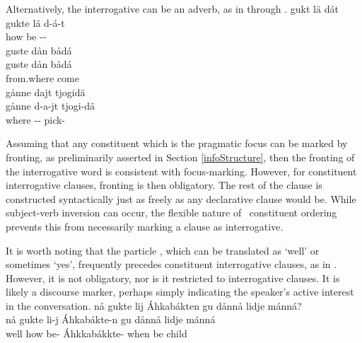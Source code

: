 Alternatively, the interrogative can be an adverb, as in  through . %
\ea\label{questionWordQ6}%
\glll	gukt lä dát\\
	gukte lä d-á-t\\
	how be\BS{} --\\\nopagebreak
{} 
\z
\ea\label{questionWordQ7}%
\glll	guste dån bådá\\
	guste dån bådá\\
	from.where  come\BS{}\\\nopagebreak
{} 
\z
\ea\label{questionWordQ8}%
\glll	gånne dajt tjogidä\\
	gånne d-a-jt tjogi-dä\\
	where -- pick-\\\nopagebreak
{} 
\z

Assuming that any constituent which is the pragmatic focus can be marked by fronting, as preliminarily asserted in Section \ref{infoStructure}, then the fronting of the interrogative word is consistent with focus-marking. However, for constituent interrogative clauses, fronting is then obligatory. 
The rest of the clause is constructed syntactically just as freely as any declarative clause would be. While subject-verb inversion can occur, the flexible nature of \PS\ constituent ordering prevents this from necessarily marking a clause as interrogative. 

It is worth noting that the particle , which can be translated as ‘well’ or sometimes ‘yes’, frequently precedes constituent interrogative clauses, as in . However, it is not obligatory, nor is it restricted to interrogative clauses. It is likely a discourse marker, perhaps simply indicating the speaker’s active interest in the conversation.
\ea\label{nåQ1}%
\glll	nå gukte lij Áhkabákten gu dånnå lidje mánná?\\
	nå gukte li-j Áhkabákte-n gu dånnå lidje mánná\\
	well how be- Áhkkabákkte- when  be\BS{} child\BS{}\\\nopagebreak
{} 
\z


